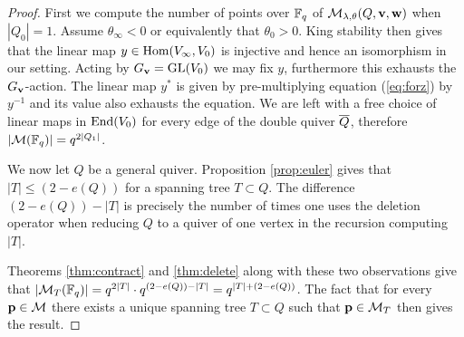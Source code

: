 \documentclass{amsart}
\theoremstyle{definition}
\begin{document}
\begin{proof}
First we compute the number of points over $\mathbb{F}_q$ of $\mathcal{M}_{\lambda,\theta}(Q, \mathbf{v}, \mathbf{w})$ when $|Q_0|=1$.
Assume $\theta_\infty<0$ or equivalently that $\theta_0>0$.
King stability then gives that the linear map $y \in \operatorname{Hom}(V_\infty, V_0)$ is injective and hence an isomorphism in our setting.
Acting by $G_{\mathbf{v}} = \operatorname{GL}(V_0)$ we may fix $y$, furthermore this exhausts the $G_{\mathbf{v}}$-action.
The linear map $y^*$ is given by pre-multiplying equation (\ref{eq:forz}) by $y^{-1}$ and its value also exhausts the equation.
We are left with a free choice of linear maps in $\operatorname{End}(V_0)$ for every edge of the double quiver ${\overline{Q}}$, therefore $|\mathcal{M}(\mathbb{F}_q)|=q^{2|Q_1|}$.

We now let $Q$ be a general quiver. 
Proposition \ref{prop:euler} gives that $|T| \leq (2-e(Q))$ for a spanning tree $T \subset Q$.
The difference $(2-e(Q))-|T|$ is precisely the number of times one uses the deletion operator when reducing $Q$ to a quiver of one vertex in the recursion computing $|T|$.

Theorems \ref{thm:contract} and \ref{thm:delete} along with these two observations give that $|\mathcal{M}_T(\mathbb{F}_q)|= q^{2 |T|} \cdot q^{(2-e(Q))-|T|} = q^{|T|+(2- e(Q))}$.
The fact that for every $\mathbf{p} \in \mathcal{M}$ there exists a unique spanning tree $T \subset Q$ such that $\mathbf{p} \in \mathcal{M}_T$ then gives the result.
\end{proof}



\end{document}
